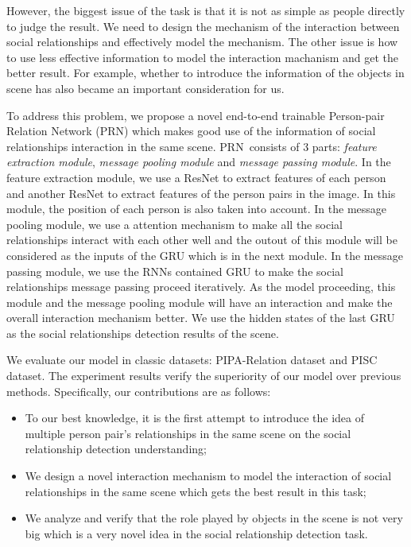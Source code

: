 \documentclass{article}
\newcommand{\PRN}{{\sf PRN}}
\begin{document}

However, the biggest issue of the task is that it is not as simple as people directly to judge the result. We need to design the mechanism of the interaction between social relationships and effectively model the mechanism. The other issue is how to use less effective information to model the interaction machanism and get the better result. For example, whether to introduce the information of the objects in scene has also became an important consideration for us.

To address this problem, we propose a novel end-to-end trainable Person-pair Relation Network (\PRN) which makes good use of the information of social relationships interaction in the same scene. \PRN \ consists of 3 parts:  \emph{feature extraction module}, \emph{message pooling module} and \emph{message passing module}. In the feature extraction module, we use a ResNet\cite{DBLP:conf/cvpr/HeZRS16} to extract features of each person and another ResNet to extract features of the person pairs in the image. In this module, the position of each person is also taken into account. In the message pooling module, we use a attention mechanism to make all the social relationships interact with each other well and the outout of this module will be considered as the inputs of the GRU which is in the next module. In the message passing module,  we use the RNNs contained GRU to make the social relationships message passing proceed iteratively. As the model proceeding, this module and the message pooling module will have an interaction and make the overall interaction mechanism better. We use the hidden states of the last GRU as the social relationships detection results of the scene.

We evaluate our model in classic datasets: PIPA-Relation dataset and PISC dataset. The experiment results verify the superiority of our model over previous methods. Specifically, our contributions are as follows:
\begin{itemize}
	\item To our best knowledge, it is the first attempt to introduce the idea of multiple person pair's relationships in the same scene on the social relationship detection understanding;
	\item We design a novel interaction mechanism to model the interaction of social relationships in the same scene which gets the best result in this task;
	\item We analyze and verify that the role played by objects in the scene is not very big which is a very novel idea in the social relationship detection task.
\end{itemize}
\end{document}
